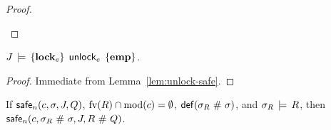 \documentclass[11pt]{report}
\begin{document}
\begin{proof}
\begin{enumerate}
    \end{enumerate}
\end{proof}

\begin{lemma}
    \label{lem:unlock-sound}
    $J\,\models\,\left\lbrace \mathbf{lock}_{e} \right\rbrace\;\operatorname{\mathsf{unlock}}_{e}\;\left\lbrace \mathbf{emp} \right\rbrace$. 
\end{lemma} 

\begin{proof}
    Immediate from Lemma~\ref{lem:unlock-safe}. 
\end{proof}

\begin{lemma}
	\label{lem:weak-interleaving-safe}
	If $\mathsf{safe}_{n}(c,\sigma,J,Q)$, $\mathrm{fv}(R) \cap \mathrm{mod}(c) = \operatorname{\emptyset}$, $\mathsf{def}(\sigma_R \operatorname{\,\#\,} \sigma)$, and $\sigma_R \,\models\, R$, then $\mathsf{safe}_{n}(c, \sigma_R \operatorname{\,\#\,} \sigma,J,R \operatorname{\,\#\,} Q)$. 
\end{lemma}
\end{document}
